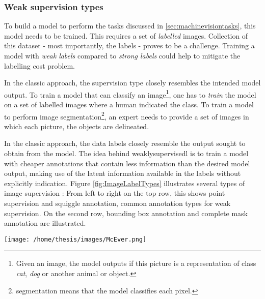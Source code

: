 \subsubsection{Weak supervision types\label{sec:weak_supervision}}
\par{
    To build a model to perform the tasks discussed in \ref{sec:machinevisiontasks}, this model needs to be trained.
    This requires a set of \textit{labelled} images.
    Collection of this dataset - most importantly, the labels - proves to be a challenge. 
    Training a model with \textit{weak labels} compared to \textit{strong labels} could help to mitigate the labelling cost problem.
}
\par{
    In the classic approach, the supervision type closely resembles the intended model output.
    To train a model that can classify an image\footnote{Given an image, the model outputs if this picture is a representation of class \textit{cat}, \textit{dog} or another animal or object. }, 
    one has to \textit{train} the model on a set of labelled images where a human indicated the class.
    To train a model to perform image segmentation\footnote{segmentation means that the model classifies each pixel.}, an expert needs to provide a set of images in which each picture, the objects are delineated.  
}
\par{
    In the classic approach, the data labels closely resemble the output sought to obtain from the model.
    The idea behind \Gls{weaklysupervisedl} is to train a model with cheaper annotations that contain less information than the desired model output, making use of the latent information available in the labels without explicitly indication.
    Figure \ref{fig:ImageLabelTypes} illustrates several types of image supervision : 
    From left to right on the top row, this shows point supervision and squiggle annotation, common annotation types for weak supervision.
    On the second row, bounding box annotation and complete mask annotation are illustrated.
}

\begin{SCfigure}[][htb]
    \centering
    \texttt{[image: /home/thesis/images/McEver.png]}
    \caption{Four different annotation types \cite{McEver2020}: 
    On the top left the picture is point level annotated. The points are inflated for visibility.
    On the top right, squiggle annotation is used.
    The bottom left shows bounding box supervion.
    While the bottom right image is fully annotated.
    An image level label would indicate that there are multiple instances of \textit{person} and \textit{bike} in the image.
    \label{fig:ImageLabelTypes}}
\end{SCfigure}

